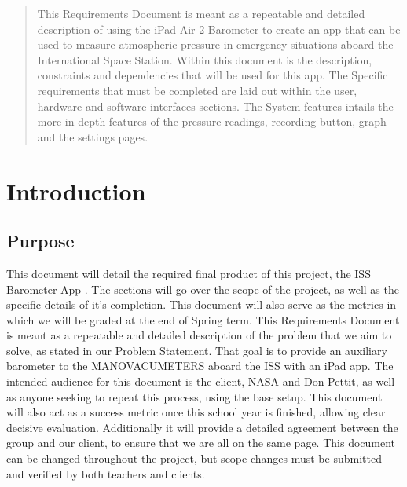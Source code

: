 \documentclass[onecolumn, draftclsnofoot,10pt, compsoc]{IEEEtran}
\def \CapstoneProjectName{ISS Barometer App }
\begin{document}
\begin{titlepage}
\begin{singlespace}
{{            }
            \vspace{20pt}
        }
        \begin{abstract}
This Requirements Document is meant as a repeatable and detailed description of using the iPad Air 2 Barometer to create an app that can be used to measure atmospheric pressure in emergency situations aboard the International Space Station.
Within this document is the description, constraints and dependencies that will be used for this app.
The Specific requirements that must be completed are laid out within the user, hardware and software interfaces sections.
The System features intails the more in depth features of the pressure readings, recording button, graph and the settings pages.
        \end{abstract}
    \end{singlespace}
\end{titlepage}
\newpage
{}
\tableofcontents
\clearpage

\section{Introduction}

\subsection{Purpose}
This document will detail the required final product of this project, the \CapstoneProjectName.
The sections will go over the scope of the project, as well as the specific details of it's completion.
This document will also serve as the metrics in which we will be graded at the end of Spring term.
This Requirements Document is meant as a repeatable and detailed description of the problem that we aim to solve, as stated in our Problem Statement.
That goal is to provide an auxiliary barometer to the MANOVACUMETERS aboard the ISS with an iPad app.
The intended audience for this document is the client, NASA and Don Pettit, as well as anyone seeking to repeat this process, using the base setup.
This document will also act as a success metric once this school year is finished, allowing clear decisive evaluation.
Additionally it will provide a detailed agreement between the group and our client, to ensure that we are all on the same page.
This document can be changed throughout the project, but scope changes must be submitted and verified by both teachers and clients.
\end{document}
